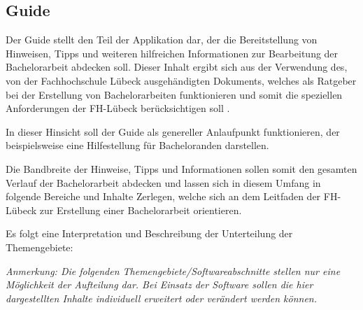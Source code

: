 \documentclass[bibliography=totoc,listof=totoc,BCOR=5mm,DIV=12,oneside]{scrbook}
\begin{document}
\par \medskip


\newpage
\subsection{Guide}
\par Der Guide stellt den Teil der Applikation dar, der die Bereitstellung von Hinweisen, Tipps und weiteren hilfreichen Informationen zur Bearbeitung der Bachelorarbeit abdecken soll. Dieser Inhalt ergibt sich aus der Verwendung des, von der Fachhochschule Lübeck ausgehändigten Dokuments, welches als Ratgeber bei der Erstellung von Bachelorarbeiten funktionieren und somit die speziellen Anforderungen der FH-Lübeck berücksichtigen soll \citep[vgl. Kapitel 1]{FHLuebeckBAAnleitung}.
\par In dieser Hinsicht soll der Guide als genereller Anlaufpunkt funktionieren, der beispielsweise eine Hilfestellung für Bacheloranden darstellen.

\par\medskip Die Bandbreite der Hinweise, Tipps und Informationen sollen somit den gesamten Verlauf der Bachelorarbeit abdecken und lassen sich in diesem Umfang in folgende Bereiche und Inhalte Zerlegen, welche sich an dem Leitfaden der FH-Lübeck\citep{FHLuebeckBAAnleitung} zur Erstellung einer Bachelorarbeit orientieren.

\par\medskip Es folgt eine Interpretation und Beschreibung der Unterteilung der Themengebiete:

\par\medskip \textit{Anmerkung: Die folgenden Themengebiete/Softwareabschnitte stellen nur eine Möglichkeit der Aufteilung dar. Bei Einsatz der Software sollen die hier dargestellten Inhalte individuell erweitert oder verändert werden können.}
\end{document}
